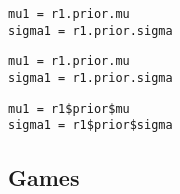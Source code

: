 \documentclass[article]{jss}
\newif\ifen
\newif\ifes
\newcommand{\en}[1]{\ifen#1\fi}
\newcommand{\es}[1]{\ifes#1\fi}
\begin{document}
\begin{paracol}{3}
\begin{lstlisting}[backgroundcolor=\color{julia}]
mu1 = r1.prior.mu
sigma1 = r1.prior.sigma
\end{lstlisting}
\switchcolumn
\begin{lstlisting}[backgroundcolor=\color{python}]
mu1 = r1.prior.mu
sigma1 = r1.prior.sigma
\end{lstlisting}
\switchcolumn
\begin{lstlisting}[backgroundcolor=\color{r}]
mu1 = r1$prior$mu
sigma1 = r1$prior$sigma
\end{lstlisting}
\end{paracol}
%
\en{The \texttt{Gaussian()} class does most of the computation of the packages (details at section \ref{sec:Gasussian}).}
\es{La clase \texttt{Gaussian()} realiza la mayor parte del c\'omputo en todos los paquetes (detalles en la secci\'on \ref{sec:Gaussian}).}


\subsection{Games} \label{sec:game}
\end{document}
